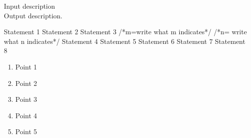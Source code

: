         \begin{algorithm}[!ht]
        \RaggedRight
        \caption{Name of the Algorithm}
        \label{label_name}
        \algorithmicrequire \quad Input description \\
        \algorithmicensure \quad Output description.
        
        \begin{algorithmic}[1]
            \State Statement 1
            \State Statement 2
            \State Statement 3  
                 \qquad \qquad /*m=write what m indicates*/
                     \qquad /*n= write what n indicates*/
                    \State Statement 4
                    \State Statement 5
                    \State Statement 6 
                \EndFor
            \EndFor
            \State Statement 7 
            \State Statement 8 
            
    \end{algorithmic}
    \end{algorithm}






\begin{enumerate}
    \item Point 1
    \item Point 2
    \item Point 3
    \item Point 4
    \item Point 5
\end{enumerate}



